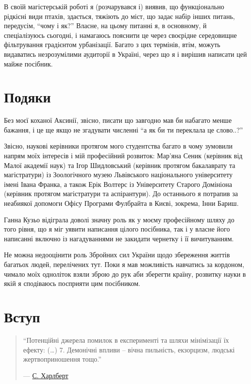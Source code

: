 \documentclass[
  11pt,
]{book}
\begin{document}
В своїй магістерській роботі я (розчарувався і) виявив, що функціонально рідкісні види птахів, здається, тяжіють до міст, що задає набір інших питань, передусім, ``чому і як?'' Власне, на цьому питанні я, в основному, й спеціалізуюсь сьогодні, і намагаюсь пояснити це через своєрідне середовищне фільтрування градієнтом урбанізації. Багато з цих термінів, втім, можуть видаватись незрозумілими аудиторії в Україні, через що я і вирішив написати цей майже посібник.

\chapter*{Подяки}\label{acknowledge}

Без моєї коханої Аксинії, звісно, писати що завгодно мав би набагато менше бажання, і це ще якщо не згадувати численні ``а як би ти переклала це слово..?''

Звісно, наукові керівники протягом мого студентства багато в чому зумовили напрям моїх інтересів і мій професійний розвиток: Мар'яна Сеник (керівник від Малої академії наук) та Ігор Шидловський (керівник протягом бакалаврату та магістратури) із Зоологічного музею Львівського національного університету імені Івана Франка, а також Ерік Волтерс із Університету Старого Домініона (керівник протягом магістратури та аспірантури). До останнього я потрапив за неабиякої допомоги Офісу Програми Фулбрайта в Києві, зокрема, Інни Бариш.

Ганна Кузьо відіграла доволі значну роль як у моєму професійному шляху до того рівня, що я міг уявити написання цілого посібника, так і у власне його написанні включно із нагадуваннями не закидати чернетку і її вичитуванням.

Не можна недооцінити роль Збройних сил України щодо збереження життів багатьох людей, перелічених тут. Поки я мав можливість навчатись за кордоном, чимало моїх одноліток взяли зброю до рук аби зберегти країну, розвитку науки в якій я сподіваюсь посприяти цим посібником.

\chapter{Вступ}\label{introduction}

\begin{quote}
``Потенційні джерела помилок в експерименті та шляхи мінімізації їх ефекту:
(\ldots)
7. Демонічні впливи -- вічна пильність, екзорцизм, людські жертвоприношення тощо.''

--- \href{https://doi.org/10.2307/1942661}{С. Харлберт}
\end{quote}
\end{document}
